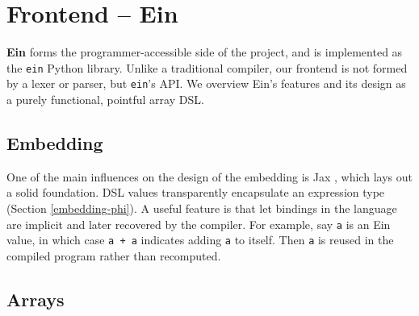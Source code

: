 \section{Frontend -- Ein}
\label{ein-dsl}

\textbf{Ein} forms the programmer-accessible side of the project, and is implemented as the \texttt{ein} Python library. Unlike a traditional compiler, our frontend is not formed by a lexer or parser, but \texttt{ein}'s API. We overview Ein's features and its design as a purely functional, pointful array DSL.

\subsection{Embedding}

One of the main influences on the design of the embedding is Jax \cite{frostig2018compiling}, which lays out a solid foundation.
DSL values transparently encapsulate an expression type (Section \ref{embedding-phi}).
A useful feature is that let bindings in the language are implicit and later recovered by the compiler.
For example, say \texttt{a} is an Ein value, in which case \texttt{a + a} indicates adding \texttt{a} to itself. 
Then \texttt{a} is reused in the compiled program rather than recomputed.

\subsection{Arrays}

